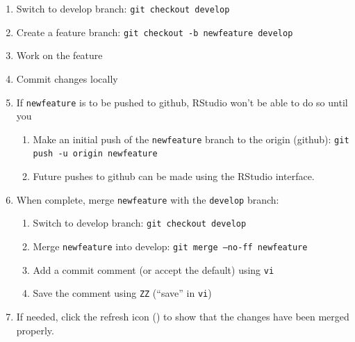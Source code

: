 \documentclass{article}
\begin{document}
\begin{enumerate}

  \item Switch to develop branch: \texttt{git checkout develop}

  \item Create a feature branch: \texttt{git checkout -b newfeature develop} 
  
  \item Work on the feature

  \item Commit changes locally

  \item If \texttt{newfeature} is to be pushed to github, RStudio won't be able to do so until you
  \begin{enumerate}

    \item Make an initial push of the \texttt{newfeature} branch
	      to the origin (github):
		  \texttt{git push -u origin newfeature} 
	
	\item Future pushes to github can be made using the RStudio interface.

  \end{enumerate}
  \item When complete, merge \texttt{newfeature} with the \texttt{develop} branch:
  \begin{enumerate}

    \item Switch to develop branch: \texttt{git checkout develop}

    \item Merge \texttt{newfeature} into develop: \texttt{git merge --no-ff newfeature}
	
	\item Add a commit comment (or accept the default) using \texttt{vi} 
	
	\item Save the comment using \texttt{ZZ} (``save'' in \texttt{vi})

  \end{enumerate}
  \item If needed, click the refresh icon 
		() to show that the 
		changes have been merged properly.
  

\end{enumerate}
\end{document}
